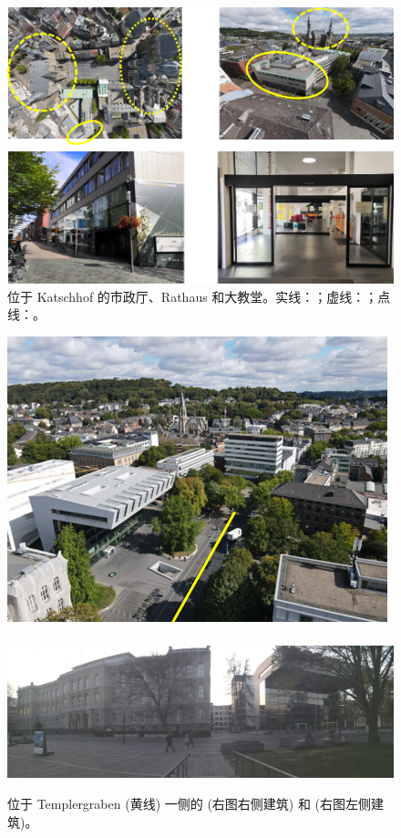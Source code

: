     \begin{figure}[ht]
      \centering
      \includegraphics[width=\textwidth]{初来乍到/Bürgerservice/位于 Katschhof 的市政厅、Rathaus 和大教堂.png}
      \caption{位于 Katschhof 的市政厅、Rathaus 和大教堂。实线：；虚线：；点线：。}
      \label{fig:位于 Katschhof 的市政厅、Rathaus 和大教堂}
    \end{figure}

    \begin{figure}[ht]
      \centering
      \includegraphics[width=.3\textwidth]{初来乍到/Bürgerservice/SuperC 和 Templergraben.png} \ \includegraphics[width=.65\textwidth]{初来乍到/Bürgerservice/SuperC 和 Hauptgebäude.jpg}
      \caption{位于 Templergraben (黄线) 一侧的  (右图右侧建筑) 和  (右图左侧建筑)。}
      \label{fig:SuperC、Templergraben 和 Hauptgebäude}
    \end{figure}


